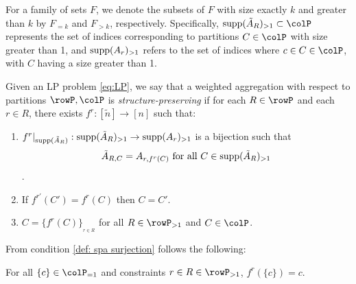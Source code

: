 For a family of sets \(F\), we denote the subsets of \(F\) with size exactly \(k\) and greater than \(k\) 
by \(F_{=k}\) and \(F_{>k}\), respectively. 
Specifically, \(\supp(\tilde{A}_R)_{>1} \subset \colP\) represents the set of indices corresponding to partitions 
\(C \in \colP\) with size greater than 1, and \(\operatorname{supp}(A_r)_{>1}\) refers to the set of indices where 
\(c \in C \in \colP\), with \(C\) having a size greater than 1.

\begin{definition}

  \label{def:structure preserving aggregation}
  Given an LP problem \eqref{eq:LP}, we say that a weighted aggregation with respect to partitions \(\rowP, \colP\) is \emph{structure-preserving} if for each \(R \in \rowP\) and each \(r \in R\), there exists \(f^r: [\tilde{n}] \to [n]\)  such that:
  \begin{enumerate}
    \item \label{def:spa bijection}\( f^r|_{\operatorname{supp}(\tilde{A}_{R})}: \operatorname{supp}(\tilde{A}_{R})_{>1} \to \operatorname{supp}(A_{r})_{>1}\) is a bijection such that
    \[\tilde{A}_{R,C} = A_{r,f^r(C)} \text{ for all } C \in \operatorname{supp}(\tilde{A}_{R})_{>1}\].
    \item \label{def: spa injection} If \(f^{r'}(C') = f^r(C)\) then \( C=C'\).
    \item \label{def: spa surjection} \(C = \{f^r(C)\}_{_{r\in R}}\) for all \(R \in \rowP_{>1}\) and \(C \in \colP\). %
  \end{enumerate}
\end{definition}
From condition \ref{def: spa surjection} follows the following:
\begin{observation}
  For all \(\{c\}\in \colP_{=1}\) and constraints \(r \in R \in \rowP_{>1}\), \(f^r(\{c\})= c\).
\end{observation}
